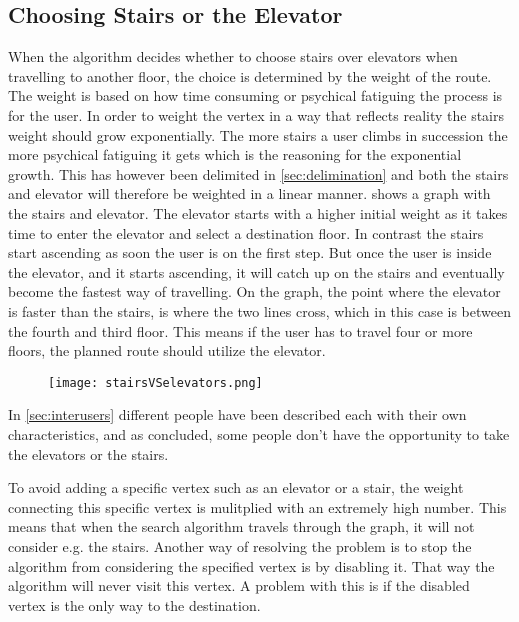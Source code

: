 \subsection{Choosing Stairs or the Elevator}

When the algorithm decides whether to choose stairs over elevators when travelling to another floor, the choice is determined by the weight of the route. The weight is based on how time consuming or psychical fatiguing the process is for the user. In order to weight the vertex in a way that reflects reality the stairs weight should grow exponentially. The more stairs a user climbs in succession the more psychical fatiguing it gets which is the reasoning for the exponential growth. This has however been delimited in \cref{sec:delimination} and both the stairs and elevator will therefore be weighted in a linear manner.  shows a graph with the stairs and elevator. The elevator starts with a higher initial weight as it takes time to enter the elevator and select a destination floor. In contrast the stairs start ascending as soon the user is on the first step. But once the user is inside the elevator, and it starts ascending, it will catch up on the stairs and eventually become the fastest way of travelling. On the graph, the point where the elevator is faster than the stairs, is where the two lines cross, which in this case is between the fourth and third floor. This means if the user has to travel four or more floors, the planned route should utilize the elevator.

\begin{figure}[ht!]
    \centering
    \texttt{[image: stairsVSelevators.png]}
    \caption{}\label{fig:labeled_stairsVSelevators}
  \end{figure}


In \cref{sec:interusers} different people have been described each with their own characteristics, and as concluded, some people don't have the opportunity to take the elevators or the stairs. 

To avoid adding a specific vertex such as an elevator or a stair, the weight connecting this specific vertex is mulitplied with an extremely high number. This means that when the search algorithm travels through the graph, it will not consider e.g. the stairs.
Another way of resolving the problem is to stop the algorithm from considering the specified vertex is by disabling it. That way the algorithm will never visit this vertex. A problem with this is if the disabled vertex is the only way to the destination.



